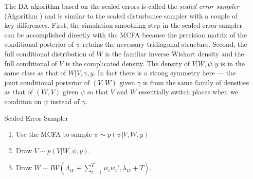 \documentclass[12pt]{article}
\begin{document}
The DA algorithm based on the scaled errors is called the {\it scaled error sampler} (Algorithm ) and is similar to the scaled disturbance sampler with a couple of key differences. First, the simulation smoothing step in the scaled error sampler can be accomplished directly with the MCFA because the precision matrix of the conditional posterior of $\psi$ retains the necessary tridiagonal structure. Second, the full conditional distribution of $W$ is the familiar inverse Wishart density and the full conditional of $V$ is the complicated density. The density of $V|W,\psi,y$ is in the same class as that of $W|V,\gamma,y$. In fact there is a strong symmetry here --- the joint conditional posterior of $(V,W)$ given $\gamma$ is from the same family of densities as that of $(W,V)$ given $\psi$ so that $V$ and $W$ essentially switch places when we condition on $\psi$ instead of $\gamma$.
\begin{alg*}[SE]Scaled Error Sampler\label{alg:DLMerror}
\begin{enumerate}
\item Use the MCFA to sample $\psi \sim  p(\psi|V,W,y)$
\item Draw $V \sim p(V|W,\psi,y)$.
\item Draw $W \sim IW\left(\Lambda_W + \sum_{t=1}^Tw_tw_t',\lambda_{W} + T\right)$.
\end{enumerate}
\end{alg*}
\end{document}
